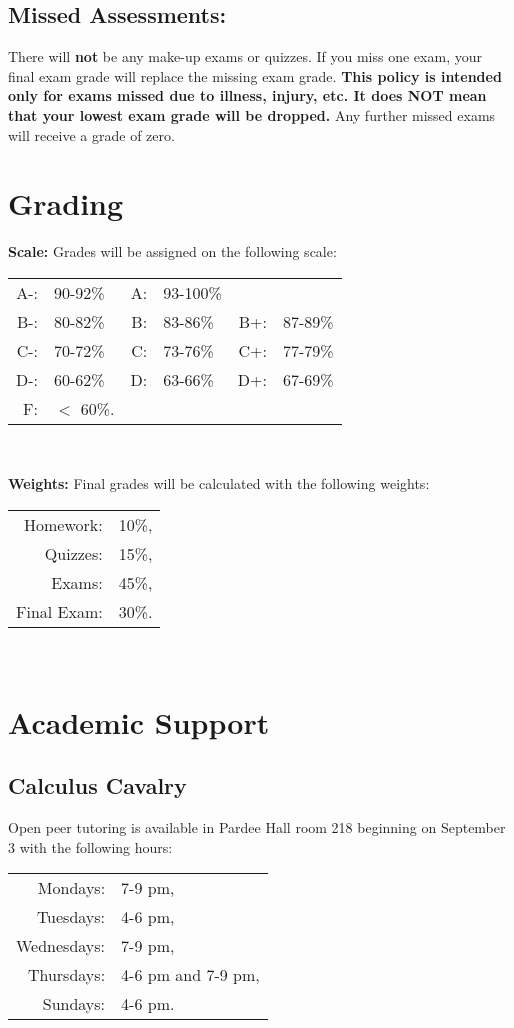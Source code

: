 \documentclass[10pt]{amsart}
\begin{document}
\subsection*{Missed Assessments:}
There will {\bf not} be any make-up exams or quizzes.
If you miss one exam, your final exam grade will replace the missing exam grade.
\textbf{This policy is intended only for exams missed due to illness, injury, etc.  
  It does NOT mean that your lowest exam grade will be dropped.}
Any further missed exams will receive a grade of zero.

\section*{Grading}
\noindent\textbf{Scale:}
Grades will be assigned on the following scale:
\begin{center}
  \begin{tabular}{rlrlrl}
    A-: & 90-92\% & A: &93-100\%\\
    B-: & 80-82\% & B: & 83-86\% & B+: &87-89\%\\
    C-: & 70-72\% & C: & 73-76\% & C+: &77-79\%\\
    D-: & 60-62\% & D: & 63-66\% & D+: &67-69\%\\
    F: & $<$ 60\%.\\
  \end{tabular}\\
\end{center}
\textbf{Weights:}
Final grades will be calculated with the following weights:
\begin{center}
  \begin{tabular}{rl}
    Homework: & 10\%,\\
    Quizzes: &15\%,\\
    Exams: & 45\%,\\
    Final Exam: & 30\%.\\
  \end{tabular}\\
\end{center}

\section*{Academic Support}
\subsection*{Calculus Cavalry}
\noindent
Open peer tutoring is available in Pardee Hall room 218 beginning on September 3 with the following hours:
\begin{center}
  \begin{tabular}{rl}
    Mondays: &7-9 pm,\\
    Tuesdays: &4-6 pm,\\
    Wednesdays: &7-9 pm,\\
    Thursdays: &4-6 pm and 7-9 pm,\\
    Sundays: &4-6 pm.
  \end{tabular}
\end{center}
\end{document}

